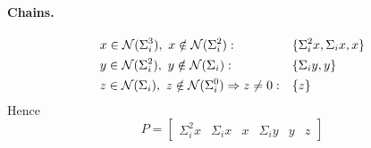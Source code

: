 \begin{example}
\paragraph{Chains.}
\begin{align*}
&x\in\mathcal{N}(\Sigma_i^3),\ x\notin\mathcal{N}(\Sigma_i^2): && \{\Sigma_i^2x,\Sigma_ix,x\}\\
&y\in\mathcal{N}(\Sigma_i^2),\ y\notin\mathcal{N}(\Sigma_i): && \{\Sigma_iy,y\}\\
&z\in\mathcal{N}(\Sigma_i),\ z\notin\mathcal{N}(\Sigma_i^0)\Rightarrow z\neq0: && \{z\}
\end{align*}
Hence 
\[
P=\left[\begin{array}{ccc|cc|c}\Sigma_i^2x&\Sigma_ix&x&\Sigma_iy&y&z\end{array}\right]
\]
\end{example}

